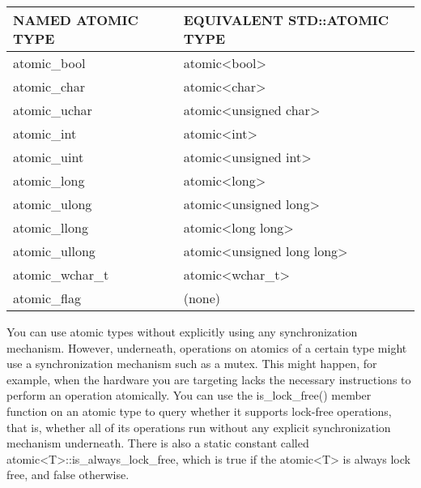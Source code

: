 \begin{longtable}{|l|l|}
\hline
\textbf{NAMED ATOMIC TYPE} & \textbf{EQUIVALENT STD::ATOMIC TYPE}              \\ \hline
\endfirsthead
%
\endhead
%
atomic\_bool               & atomic\textless{}bool\textgreater{}               \\ \hline
atomic\_char               & atomic\textless{}char\textgreater{}               \\ \hline
atomic\_uchar              & atomic\textless{}unsigned char\textgreater{}      \\ \hline
atomic\_int                & atomic\textless{}int\textgreater{}                \\ \hline
atomic\_uint               & atomic\textless{}unsigned int\textgreater{}       \\ \hline
atomic\_long               & atomic\textless{}long\textgreater{}               \\ \hline
atomic\_ulong              & atomic\textless{}unsigned long\textgreater{}      \\ \hline
atomic\_llong              & atomic\textless{}long long\textgreater{}          \\ \hline
atomic\_ullong             & atomic\textless{}unsigned long long\textgreater{} \\ \hline
atomic\_wchar\_t           & atomic\textless{}wchar\_t\textgreater{}           \\ \hline
atomic\_flag               & (none)                                            \\ \hline
\end{longtable}

You can use atomic types without explicitly using any synchronization mechanism. However, underneath, operations on atomics of a certain type might use a synchronization mechanism such as a mutex. This might happen, for example, when the hardware you are targeting lacks the necessary instructions to perform an operation atomically. You can use the is\_lock\_free() member function on an atomic type to query whether it supports lock-free operations, that is, whether all of its operations run without any explicit synchronization mechanism underneath. There is also a static constant called atomic<T>::is\_always\_lock\_free, which is true if the atomic<T> is always lock free, and false otherwise.

